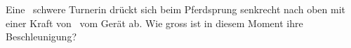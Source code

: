 Eine \mTuO\ schwere Turnerin drückt sich beim Pferdsprung senkrecht nach oben mit einer Kraft von \FTuO\ vom Gerät ab. Wie gross ist in diesem Moment ihre Beschleunigung?
